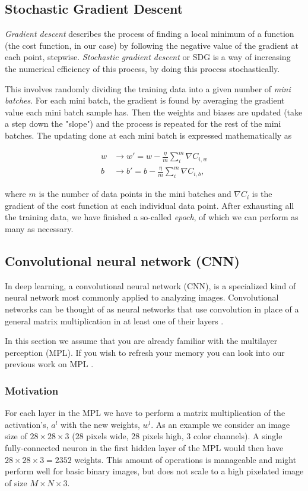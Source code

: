 \documentclass[../main.tex]{subfiles}
\begin{document}
\subsection{Stochastic Gradient Descent}\label{sec:sgd}
\textit{Gradient descent} describes the process of finding a local minimum of a function (the cost function, in our case) by following the negative value of the gradient at each point, stepwise. \textit{Stochastic gradient descent} or SDG is a way of increasing the numerical efficiency of this process, by doing this process stochastically.

This involves randomly dividing the training data into a given number of \textit{mini batches}. For each mini batch, the gradient is found by averaging the gradient value each mini batch sample has. Then the weights and biases are updated (take a step down the "slope") and the process is repeated for the rest of the mini batches. The updating done at each mini batch is expressed mathematically as

\begin{align*}
    w&\rightarrow w' = w - \frac{\eta}{m}\sum_i^m \nabla C_{i,w} \\
    b&\rightarrow b' = b - \frac{\eta}{m}\sum_i^m \nabla C_{i,b},
\end{align*}

where $m$ is the number of data points in the mini batches and $\nabla C_i$ is the gradient of the cost function at each individual data point. After exhausting all the training data, we have finished a so-called \textit{epoch}, of which we can perform as many as necessary.

\subsection{Convolutional neural network (CNN)}
In deep learning, a convolutional neural network (CNN), is a specialized kind of neural network most commonly applied to analyzing images. Convolutional networks can be thought of as neural networks that use convolution in place of a general matrix multiplication in at least one of their layers \cite{Goodfellow-et-al-2016}. 

In this section we assume that you are already familiar with the multilayer perception (MPL). If you wish to refresh your memory you can look into our previous work on MPL \cite{project2}. %

\subsubsection{Motivation}
For each layer in the MPL we have to perform a matrix multiplication of the activation's, $a^l$ with the new weights, $w^l$. As an example we consider an image size of \ensuremath{28\times28\times3} (28 pixels wide, 28 pixels high, 3 color channels). A single fully-connected neuron in the first hidden layer of the MPL would then have \ensuremath{28\times28\times3=2352} weights. This amount of operations is manageable and might perform well for basic binary images, but does not scale to a high pixelated image of size \ensuremath{M\times N\times3}.
\end{document}
